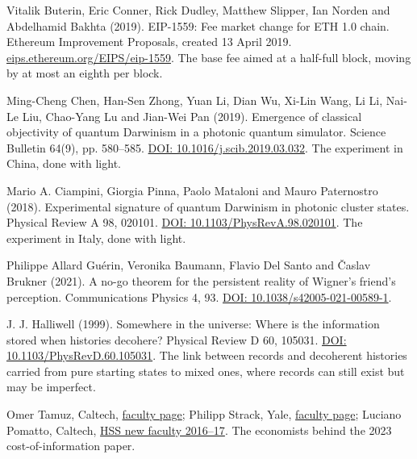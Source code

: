 \documentclass[11pt,twoside]{article}
\theoremstyle{thielethm}
\theoremstyle{thieledef}
\theoremstyle{thieledef}
\theoremstyle{thieledef}
\theoremstyle{thielethm}
\theoremstyle{thieleobs}
\theoremstyle{thielethm}
\begin{document}
\noindent Vitalik Buterin, Eric Conner, Rick Dudley, Matthew Slipper, Ian Norden and Abdelhamid Bakhta (2019). EIP-1559: Fee market change for ETH 1.0 chain. Ethereum Improvement Proposals, created 13 April 2019. \href{https://eips.ethereum.org/EIPS/eip-1559}{eips.ethereum.org/EIPS/eip-1559}. The base fee aimed at a half-full block, moving by at most an eighth per block.
\par\medskip

\noindent Ming-Cheng Chen, Han-Sen Zhong, Yuan Li, Dian Wu, Xi-Lin Wang, Li Li, Nai-Le Liu, Chao-Yang Lu and Jian-Wei Pan (2019). Emergence of classical objectivity of quantum Darwinism in a photonic quantum simulator. Science Bulletin 64(9), pp. 580--585. \href{https://doi.org/10.1016/j.scib.2019.03.032}{DOI: 10.1016/j.scib.2019.03.032}. The experiment in China, done with light.
\par\medskip

\noindent Mario A. Ciampini, Giorgia Pinna, Paolo Mataloni and Mauro Paternostro (2018). Experimental signature of quantum Darwinism in photonic cluster states. Physical Review A 98, 020101. \href{https://doi.org/10.1103/PhysRevA.98.020101}{DOI: 10.1103/PhysRevA.98.020101}. The experiment in Italy, done with light.
\par\medskip

\noindent Philippe Allard Gu\'erin, Veronika Baumann, Flavio Del Santo and \v{C}aslav Brukner (2021). A no-go theorem for the persistent reality of Wigner's friend's perception. Communications Physics 4, 93. \href{https://doi.org/10.1038/s42005-021-00589-1}{DOI: 10.1038/s42005-021-00589-1}.
\par\medskip

\noindent J. J. Halliwell (1999). Somewhere in the universe: Where is the information stored when histories decohere? Physical Review D 60, 105031. \href{https://doi.org/10.1103/PhysRevD.60.105031}{DOI: 10.1103/PhysRevD.60.105031}. The link between records and decoherent histories carried from pure starting states to mixed ones, where records can still exist but may be imperfect.
\par\medskip

\noindent Omer Tamuz, Caltech, \href{https://www.hss.caltech.edu/people/omer-tamuz}{faculty page}; Philipp Strack, Yale, \href{https://economics.yale.edu/people/philipp-strack}{faculty page}; Luciano Pomatto, Caltech, \href{https://hss.caltech.edu/documents/3303/HSS_New_Faces_2016-2017_FINAL.pdf}{HSS new faculty 2016--17}. The economists behind the 2023 cost-of-information paper.
\par\medskip
\end{document}
